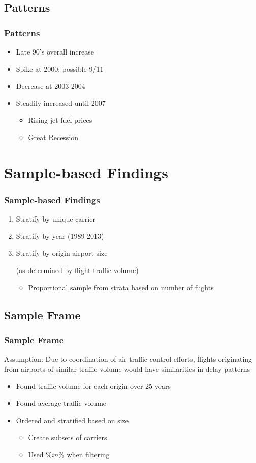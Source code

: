 \documentclass{beamer}
\begin{document}
\subsection{Patterns}
\begin{frame}
\frametitle{Patterns}
\begin{itemize}
\item Late 90's overall increase
\item Spike at 2000: possible 9/11
\item Decrease at 2003-2004
\item Steadily increased until 2007 
\begin{itemize}
\item Rising jet fuel prices 
\item Great Recession 
\end{itemize}
\end{itemize}

\end{frame}

\section{Sample-based Findings}
\begin{frame}
\frametitle{Sample-based Findings}
\begin{enumerate}
\item Stratify by unique carrier
\item Stratify by year (1989-2013)
\item Stratify by origin airport size 

(as determined by flight traffic volume)
\begin{itemize}
\item Proportional sample from strata based on number of flights 
\end{itemize}
\end{enumerate}

\end{frame}

\subsection{Sample Frame}
\begin{frame}
\frametitle{Sample Frame}
Assumption: Due to coordination of air traffic control efforts, flights originating from airports of similar traffic volume would have similarities in delay patterns
\begin{itemize}
\item Found traffic volume for each origin over 25 years 
\item Found average traffic volume 
\item Ordered and stratified based on size
\begin{itemize}
\item Create subsets of carriers 
\item Used $\%in\%$ when filtering
\end{itemize}
\end{itemize}
\end{frame}
\end{document}
